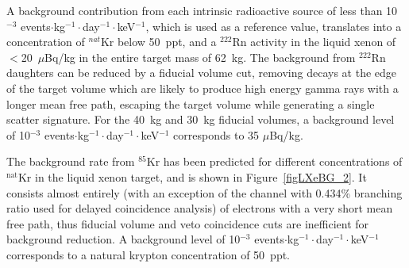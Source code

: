 A background contribution from each intrinsic radioactive source of less than 10$^{-3}$ events$\cdot$kg$^{-1}\cdot$day$^{-1}\cdot$keV$^{-1}$, which is used as a reference value, translates into a concentration of $^{nat}$Kr below 50~ppt, and a $^{222}$Rn activity in the liquid xenon of $<$20~$\mu$Bq/kg in the entire target mass of 62~kg. The background from $^{222}$Rn daughters can be reduced by a fiducial volume cut, removing decays at the edge of the target volume which are likely to produce high energy gamma rays with a longer mean free path, escaping the target volume while generating a single scatter signature. For the 40~kg and 30~kg fiducial volumes, a background level of 10$^{-3}$ events$\cdot$kg$^{-1}\cdot$day$^{-1}\cdot$keV$^{-1}$ corresponds to 35 $\mu$Bq/kg.

The background rate from $^{85}$Kr has been predicted for different  concentrations of $^{\mathrm{nat}}$Kr in the liquid xenon target, and is shown in Figure~\ref{figLXeBG_2}. It consists almost entirely (with an exception of the channel with 0.434\% branching ratio used for delayed coincidence analysis) of electrons with a very short mean free path, thus fiducial volume and veto coincidence cuts are inefficient for background reduction. A background level of 10$^{-3}$ events$\cdot$kg$^{-1}\cdot$day$^{-1}\cdot$keV$^{-1}$ corresponds to a natural krypton concentration of 50~ppt. 
